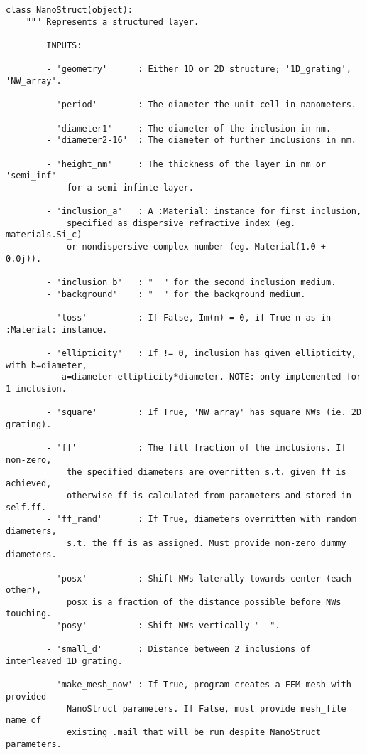 \documentclass[11pt,a4paper,twoside]{report}
\begin{document}
\begin{lstlisting}
class NanoStruct(object):
    """ Represents a structured layer.

        INPUTS:

        - 'geometry'      : Either 1D or 2D structure; '1D_grating', 'NW_array'.

        - 'period'        : The diameter the unit cell in nanometers.

        - 'diameter1'     : The diameter of the inclusion in nm.
        - 'diameter2-16'  : The diameter of further inclusions in nm.

        - 'height_nm'     : The thickness of the layer in nm or 'semi_inf'
            for a semi-infinte layer.

        - 'inclusion_a'   : A :Material: instance for first inclusion, 
            specified as dispersive refractive index (eg. materials.Si_c) 
            or nondispersive complex number (eg. Material(1.0 + 0.0j)).

        - 'inclusion_b'   : "  " for the second inclusion medium.
        - 'background'    : "  " for the background medium.

        - 'loss'          : If False, Im(n) = 0, if True n as in :Material: instance.

        - 'ellipticity'   : If != 0, inclusion has given ellipticity, with b=diameter,
           a=diameter-ellipticity*diameter. NOTE: only implemented for 1 inclusion.

        - 'square'        : If True, 'NW_array' has square NWs (ie. 2D grating).

        - 'ff'            : The fill fraction of the inclusions. If non-zero, 
            the specified diameters are overritten s.t. given ff is achieved,
            otherwise ff is calculated from parameters and stored in self.ff.
        - 'ff_rand'       : If True, diameters overritten with random diameters,
            s.t. the ff is as assigned. Must provide non-zero dummy diameters.
        
        - 'posx'          : Shift NWs laterally towards center (each other), 
            posx is a fraction of the distance possible before NWs touching.
        - 'posy'          : Shift NWs vertically "  ". 
 
        - 'small_d'       : Distance between 2 inclusions of interleaved 1D grating.

        - 'make_mesh_now' : If True, program creates a FEM mesh with provided 
            NanoStruct parameters. If False, must provide mesh_file name of 
            existing .mail that will be run despite NanoStruct parameters.


\end{lstlisting}
\end{document}
